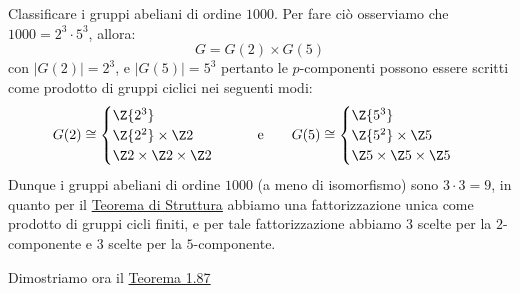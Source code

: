 \documentclass[11pt]{scrartcl}
\begin{document}
\begin{example}
    Classificare i gruppi abeliani di ordine $1000$. Per fare ciò osserviamo che $1000 = 2^3 \cdot 5^3$, allora:
    \[  G = G(2) \times G(5)
        \]
    con $|G(2)| = 2^3$, e $|G(5)| = 5^3$ pertanto le $p$-componenti possono essere scritti come prodotto di gruppi ciclici nei seguenti modi:
    \[ G(2) \cong \begin{cases}
                    \Z{2^3} \\
                    \Z{2^2} \times \Z2 \\
                    \Z2 \times \Z2 \times \Z2
                \end{cases}
    \qquad \text e \qquad
    G(5) \cong \begin{cases}
        \Z{5^3} \\
        \Z{5^2} \times \Z5 \\
        \Z5 \times \Z5 \times \Z5
    \end{cases}
        \]
    Dunque i gruppi abeliani di ordine $1000$ (a meno di isomorfismo) sono $3\cdot 3 = 9$, in quanto per il \hyperref[t:struttura]{Teorema di Struttura} abbiamo
    una fattorizzazione unica come prodotto di gruppi cicli finiti, e per tale fattorizzazione abbiamo $3$ scelte per la $2$-componente e $3$ scelte per la $5$-componente.
\end{example}

Dimostriamo ora il \hyperref[t:t1]{Teorema 1.87}
\end{document}
